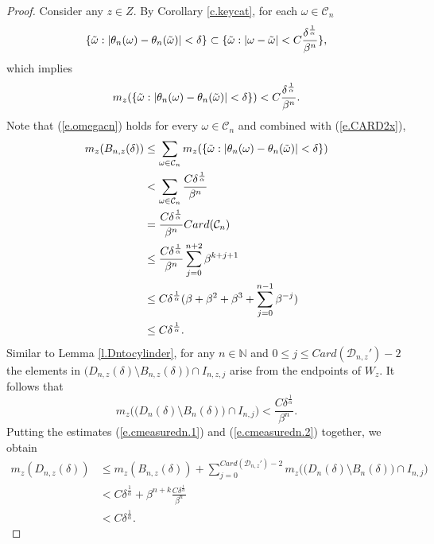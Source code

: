 \documentclass{amsart}
\newcommand{\NN}{\mathbb{N}}
\newcommand{\C}{\mathcal{C}}
\newcommand{\D}{\mathcal{D}}
\begin{document}
\begin{proof}
    Consider any $z\in Z$. By Corollary \ref{c.keycat}, for each $\omega\in \C_n$
    \[\{\Tilde{\omega}: |\theta_n(\omega) - \theta_n(\Tilde{\omega})|<\delta\} \subset \{\Tilde{\omega}: |\omega- \Tilde{\omega}| < C\frac{\delta^{\frac{1}{\alpha}}}{\beta^n}\},\]
    which implies
    \begin{equation}\label{e.omegacn}
        m_z(\{\Tilde{\omega}: |\theta_n(\omega) - \theta_n(\Tilde{\omega})|<\delta\}) < C\frac{\delta^{\frac{1}{\alpha}}}{\beta^n}.
    \end{equation}
    Note that (\ref{e.omegacn}) holds for every $\omega\in \C_n$ and combined with (\ref{e.CARD2x}),
    \begin{align}
        m_z(B_{n,z}(\delta)) &\leq \sum_{\omega\in \C_n} m_z(\{\Tilde{\omega}: |\theta_n(\omega) - \theta_n(\Tilde{\omega})|<\delta\}) \nonumber\\
        &< \sum_{\omega\in \C_n} \frac{C\delta^{\frac{1}{\alpha}}}{\beta^n} \nonumber\\
        &= \frac{C\delta^{\frac{1}{\alpha}}}{\beta^n} Card(\C_n)\nonumber\\
        &\leq \frac{C\delta^{\frac{1}{\alpha}}}{\beta^n}\sum_{j=0}^{n+2}\beta^{k+j+1} \nonumber\\
        &\leq C\delta^{\frac{1}{\alpha}} (\beta + \beta^2 + \beta^3 + \sum_{j=0}^{n-1} \beta^{-j}) \nonumber\\
        &\leq C\delta^{\frac{1}{\alpha}} \label{e.cmeasuredn.1}.
    \end{align}
    Similar to Lemma \ref{l.Dntocylinder}, for any $n\in \NN$ and $0\leq j \leq Card(\D_{n,z}')-2$ the elements in $\Big(D_{n,z}(\delta) \setminus B_{n,z}(\delta)\Big)\cap I_{n,z,j}$ arise from the endpoints of $W_z$. It follows that
    \begin{equation*}\label{e.cmeasuredn.2}
        m_z\Bigg(\Big(D_n(\delta)\setminus B_n(\delta)\Big) \cap I_{n,j}\Bigg) < \frac{C\delta^{\frac{1}{\alpha}}}{\beta^n}.
    \end{equation*}
    Putting the estimates (\ref{e.cmeasuredn.1}) and (\ref{e.cmeasuredn.2}) together, we obtain
    \begin{align*}
        m_z(D_{n,z}(\delta)) &\leq m_z(B_{n,z}(\delta)) + \sum_{j=0}^{Card(\D_{n,z}') -2}m_z\Bigg(\Big(D_n(\delta)\setminus B_n(\delta)\Big) \cap I_{n,j}\Bigg) \\
        &< C\delta^{\frac{1}{\alpha}} + \beta^{n+k}\frac{C\delta^{\frac{1}{\alpha}}}{\beta^n} \\
        &<  C\delta^{\frac{1}{\alpha}}.
    \end{align*}
\end{proof}
\end{document}
